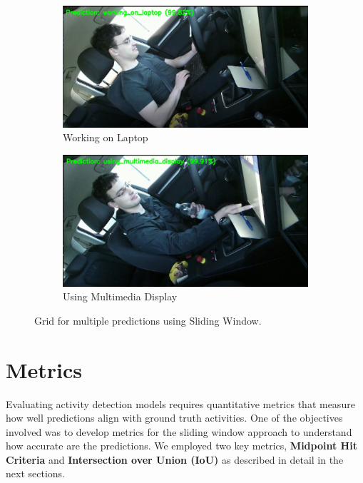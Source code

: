 \documentclass{article}
\begin{document}
\begin{figure}[ht]
    \begin{subfigure}{0.45\textwidth}
        \centering
        \includegraphics[width=\textwidth]{figs/DAR3.png}
        \caption{Working on Laptop}
    \end{subfigure}
    \hspace{0.5cm}
    \begin{subfigure}{0.45\textwidth}
        \centering
        \includegraphics[width=\textwidth]{figs/DAR4.png}
        \caption{Using Multimedia Display}
    \end{subfigure}

    \caption{Grid for multiple predictions using Sliding Window.}
    \label{fig:sliding-window-predictions}
\end{figure}

\section{Metrics}
Evaluating activity detection models requires quantitative metrics that measure how well predictions align with ground truth activities. One of the objectives involved was to develop metrics for the sliding window approach to understand how accurate are the predictions. We employed two key metrics, \textbf{Midpoint Hit Criteria} and \textbf{Intersection over Union (IoU)} as described in detail in the next sections.
\end{document}
